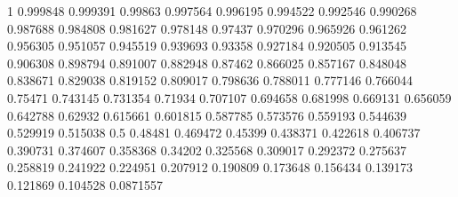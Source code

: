 
\def\pgf@def#1#2#3{\expandafter\def\csname pgf@#1#2\endcsname{#3}}
\pgf@def{cos}{0}{1}           \pgf@def{cos}{1}{0.999848}
\pgf@def{cos}{2}{0.999391}    \pgf@def{cos}{3}{0.99863}
\pgf@def{cos}{4}{0.997564}    \pgf@def{cos}{5}{0.996195}
\pgf@def{cos}{6}{0.994522}    \pgf@def{cos}{7}{0.992546}
\pgf@def{cos}{8}{0.990268}    \pgf@def{cos}{9}{0.987688}
\pgf@def{cos}{10}{0.984808}   \pgf@def{cos}{11}{0.981627}
\pgf@def{cos}{12}{0.978148}   \pgf@def{cos}{13}{0.97437}
\pgf@def{cos}{14}{0.970296}   \pgf@def{cos}{15}{0.965926}
\pgf@def{cos}{16}{0.961262}   \pgf@def{cos}{17}{0.956305}
\pgf@def{cos}{18}{0.951057}   \pgf@def{cos}{19}{0.945519}
\pgf@def{cos}{20}{0.939693}   \pgf@def{cos}{21}{0.93358}
\pgf@def{cos}{22}{0.927184}   \pgf@def{cos}{23}{0.920505}
\pgf@def{cos}{24}{0.913545}   \pgf@def{cos}{25}{0.906308}
\pgf@def{cos}{26}{0.898794}   \pgf@def{cos}{27}{0.891007}
\pgf@def{cos}{28}{0.882948}   \pgf@def{cos}{29}{0.87462}
\pgf@def{cos}{30}{0.866025}   \pgf@def{cos}{31}{0.857167}
\pgf@def{cos}{32}{0.848048}   \pgf@def{cos}{33}{0.838671}
\pgf@def{cos}{34}{0.829038}   \pgf@def{cos}{35}{0.819152}
\pgf@def{cos}{36}{0.809017}   \pgf@def{cos}{37}{0.798636}
\pgf@def{cos}{38}{0.788011}   \pgf@def{cos}{39}{0.777146}
\pgf@def{cos}{40}{0.766044}   \pgf@def{cos}{41}{0.75471}
\pgf@def{cos}{42}{0.743145}   \pgf@def{cos}{43}{0.731354}
\pgf@def{cos}{44}{0.71934}    \pgf@def{cos}{45}{0.707107}
\pgf@def{cos}{46}{0.694658}   \pgf@def{cos}{47}{0.681998}
\pgf@def{cos}{48}{0.669131}   \pgf@def{cos}{49}{0.656059}
\pgf@def{cos}{50}{0.642788}   \pgf@def{cos}{51}{0.62932}
\pgf@def{cos}{52}{0.615661}   \pgf@def{cos}{53}{0.601815}
\pgf@def{cos}{54}{0.587785}   \pgf@def{cos}{55}{0.573576}
\pgf@def{cos}{56}{0.559193}   \pgf@def{cos}{57}{0.544639}
\pgf@def{cos}{58}{0.529919}   \pgf@def{cos}{59}{0.515038}
\pgf@def{cos}{60}{0.5}        \pgf@def{cos}{61}{0.48481}
\pgf@def{cos}{62}{0.469472}   \pgf@def{cos}{63}{0.45399}
\pgf@def{cos}{64}{0.438371}   \pgf@def{cos}{65}{0.422618}
\pgf@def{cos}{66}{0.406737}   \pgf@def{cos}{67}{0.390731}
\pgf@def{cos}{68}{0.374607}   \pgf@def{cos}{69}{0.358368}
\pgf@def{cos}{70}{0.34202}    \pgf@def{cos}{71}{0.325568}
\pgf@def{cos}{72}{0.309017}   \pgf@def{cos}{73}{0.292372}
\pgf@def{cos}{74}{0.275637}   \pgf@def{cos}{75}{0.258819}
\pgf@def{cos}{76}{0.241922}   \pgf@def{cos}{77}{0.224951}
\pgf@def{cos}{78}{0.207912}   \pgf@def{cos}{79}{0.190809}
\pgf@def{cos}{80}{0.173648}   \pgf@def{cos}{81}{0.156434}
\pgf@def{cos}{82}{0.139173}   \pgf@def{cos}{83}{0.121869}
\pgf@def{cos}{84}{0.104528}   \pgf@def{cos}{85}{0.0871557}
